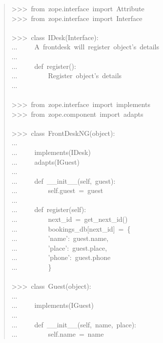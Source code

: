 \documentclass[a4paper,openany,twoside,final]{book}
\begin{document}
\begin{quote}{\ttfamily \raggedright \noindent
>{}>{}>~from~zope.interface~import~Attribute\\
>{}>{}>~from~zope.interface~import~Interface\\
~\\
>{}>{}>~class~IDesk(Interface):\\
...~~~~~\textquotedbl{}\textquotedbl{}\textquotedbl{}A~frontdesk~will~register~object's~details\textquotedbl{}\textquotedbl{}\textquotedbl{}\\
...\\
...~~~~~def~register():\\
...~~~~~~~~~\textquotedbl{}\textquotedbl{}\textquotedbl{}Register~object's~details\textquotedbl{}\textquotedbl{}\textquotedbl{}\\
...\\
~\\
>{}>{}>~from~zope.interface~import~implements\\
>{}>{}>~from~zope.component~import~adapts\\
~\\
>{}>{}>~class~FrontDeskNG(object):\\
...\\
...~~~~~implements(IDesk)\\
...~~~~~adapts(IGuest)\\
...\\
...~~~~~def~\_\_init\_\_(self,~guest):\\
...~~~~~~~~~self.guest~=~guest\\
...\\
...~~~~~def~register(self):\\
...~~~~~~~~~next\_id~=~get\_next\_id()\\
...~~~~~~~~~bookings\_db{[}next\_id{]}~=~\{\\
...~~~~~~~~~'name':~guest.name,\\
...~~~~~~~~~'place':~guest.place,\\
...~~~~~~~~~'phone':~guest.phone\\
...~~~~~~~~~\}\\
~\\
>{}>{}>~class~Guest(object):\\
...\\
...~~~~~implements(IGuest)\\
...\\
...~~~~~def~\_\_init\_\_(self,~name,~place):\\
...~~~~~~~~~self.name~=~name\\
}
\end{quote}
\end{document}
